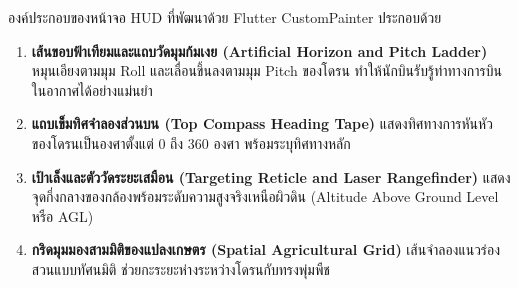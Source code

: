 องค์ประกอบของหน้าจอ HUD ที่พัฒนาด้วย Flutter CustomPainter ประกอบด้วย
\begin{enumerate}
    \item \textbf{เส้นขอบฟ้าเทียมและแถบวัดมุมก้มเงย (Artificial Horizon and Pitch Ladder)} หมุนเอียงตามมุม Roll และเลื่อนขึ้นลงตามมุม Pitch ของโดรน ทำให้นักบินรับรู้ท่าทางการบินในอากาศได้อย่างแม่นยำ
    \item \textbf{แถบเข็มทิศจำลองส่วนบน (Top Compass Heading Tape)} แสดงทิศทางการหันหัวของโดรนเป็นองศาตั้งแต่ 0 ถึง 360 องศา พร้อมระบุทิศทางหลัก
    \item \textbf{เป้าเล็งและตัววัดระยะเสมือน (Targeting Reticle and Laser Rangefinder)} แสดงจุดกึ่งกลางของกล้องพร้อมระดับความสูงจริงเหนือผิวดิน (Altitude Above Ground Level หรือ AGL)
    \item \textbf{กริดมุมมองสามมิติของแปลงเกษตร (Spatial Agricultural Grid)} เส้นจำลองแนวร่องสวนแบบทัศนมิติ ช่วยกะระยะห่างระหว่างโดรนกับทรงพุ่มพืช
\end{enumerate}

